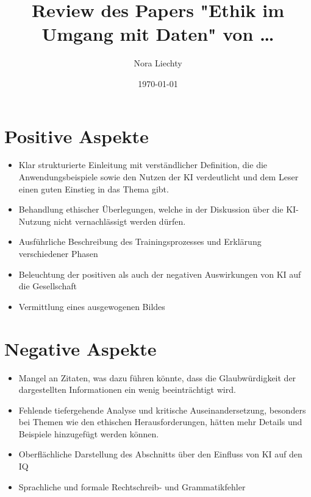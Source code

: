 \documentclass{article}
\title{Review des Papers "Ethik im Umgang mit Daten" von \dots}
\author{Nora Liechty}
\date{\today}
\begin{document}
\maketitle


\section{Positive Aspekte}

\begin{itemize}

    \item Klar strukturierte Einleitung mit verständlicher Definition, die die Anwendungsbeispiele sowie den Nutzen der KI verdeutlicht und dem Leser einen guten Einstieg in das Thema gibt. 
    \item Behandlung ethischer Überlegungen, welche in der Diskussion über die KI-Nutzung nicht vernachlässigt werden dürfen. 
    \item Ausführliche Beschreibung des Trainingsprozesses und Erklärung verschiedener Phasen
    \item Beleuchtung der positiven als auch der negativen Auswirkungen von KI auf die Gesellschaft
    \item Vermittlung eines ausgewogenen Bildes 
    
\end{itemize}

\section{Negative Aspekte}

\begin{itemize}

    \item Mangel an Zitaten, was dazu führen könnte, dass die Glaubwürdigkeit der dargestellten Informationen ein wenig beeinträchtigt wird. 
    \item Fehlende tiefergehende Analyse und kritische Auseinandersetzung, besonders bei Themen wie den ethischen Herausforderungen, hätten mehr Details und Beispiele hinzugefügt werden können. 
    \item Oberflächliche Darstellung des Abschnitts über den Einfluss von KI auf den IQ
    \item Sprachliche und formale Rechtschreib- und Grammatikfehler 
    
\end{itemize}
\end{document}
